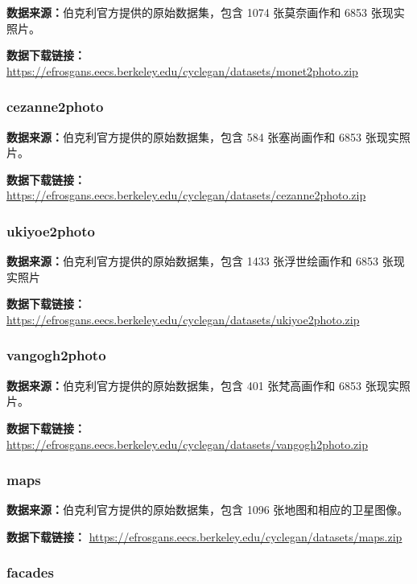 \textbf{数据来源：}伯克利官方提供的原始数据集，包含 1074 张莫奈画作和 6853 张现实照片。

\textbf{数据下载链接：}
\url{https://efrosgans.eecs.berkeley.edu/cyclegan/datasets/monet2photo.zip}

\subsubsection{cezanne2photo}

\textbf{数据来源：}伯克利官方提供的原始数据集，包含 584 张塞尚画作和 6853 张现实照片。

\textbf{数据下载链接：}
\url{https://efrosgans.eecs.berkeley.edu/cyclegan/datasets/cezanne2photo.zip}

\subsubsection{ukiyoe2photo}

\textbf{数据来源：}伯克利官方提供的原始数据集，包含 1433 张浮世绘画作和 6853 张现实照片

\textbf{数据下载链接：}
\url{https://efrosgans.eecs.berkeley.edu/cyclegan/datasets/ukiyoe2photo.zip}

\subsubsection{vangogh2photo}

\textbf{数据来源：}伯克利官方提供的原始数据集，包含 401 张梵高画作和 6853 张现实照片。

\textbf{数据下载链接：}
\url{https://efrosgans.eecs.berkeley.edu/cyclegan/datasets/vangogh2photo.zip}

\subsubsection{maps}

\textbf{数据来源：}伯克利官方提供的原始数据集，包含 1096 张地图和相应的卫星图像。

\textbf{数据下载链接：}
\url{https://efrosgans.eecs.berkeley.edu/cyclegan/datasets/maps.zip}

\subsubsection{facades}

